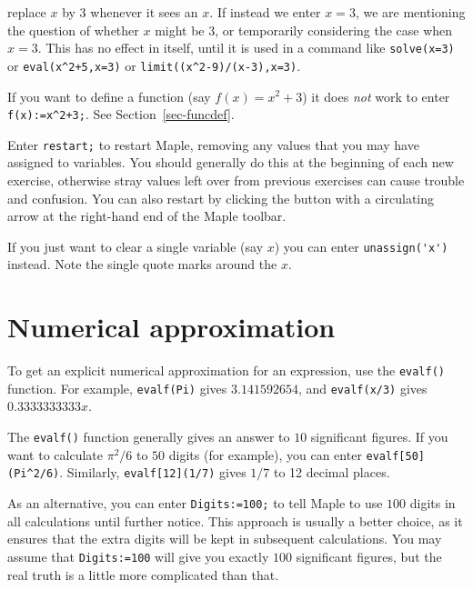 \documentclass{amsart}
\begin{document}
\begin{secenum}
 replace $x$ by $3$ whenever it sees an $x$.  If instead we
 enter $x=3$, we are mentioning the question of whether $x$
 might be $3$, or temporarily considering the case when
 $x=3$.  This has no effect in itself, until it is used in a
 command like \verb~solve(x=3)~ or \verb~eval(x^2+5,x=3)~
 or \verb~limit((x^2-9)/(x-3),x=3)~. 
%
 \item\label{funcdef}
 If you want to define a function (say $f(x)=x^2+3$) it does
 \emph{not} work to enter \verb~f(x):=x^2+3;~.  See
 Section~\ref{sec-funcdef}. 
%
 \item\label{restart}
  Enter \verb~restart;~ to restart Maple, removing any values
  that you may have assigned to variables.  You should
  generally do this at the beginning of each new exercise,
  otherwise stray values left over from previous exercises
  can cause trouble and confusion.  You can also restart by
  clicking the button with a circulating arrow at the
  right-hand end of the Maple toolbar. 
%
 \item\label{unassign}
  If you just want to clear a single variable (say $x$) you
  can enter \verb~unassign('x')~ instead.  Note the single
  quote marks around the $x$. 
\end{secenum}

\section{Numerical approximation}


\begin{secenum}
 \item\label{evalf} To get an explicit numerical approximation for an
  expression, use the \verb~evalf()~ function.  For example,
  \verb~evalf(Pi)~ gives $3.141592654$, and
  \verb~evalf(x/3)~ gives $0.3333333333 x$. 
%
 \item\label{evalfdigits} The \verb~evalf()~ function generally gives an
  answer to $10$ significant figures.  If you want to
  calculate $\pi^2/6$ to $50$ digits (for example), you can
  enter \verb~evalf[50](Pi^2/6)~.  Similarly,
  \verb~evalf[12](1/7)~ gives $1/7$ to 12 decimal places. 
%
 \item\label{digits} As an alternative, you can enter
   \verb~Digits:=100;~ to tell Maple to use $100$ digits in
   all calculations until further notice.  This approach is
   usually a better choice, as it ensures that the extra
   digits will be kept in subsequent calculations.  You may
   assume that \verb~Digits:=100~ will give you exactly
   $100$ significant figures, but the real truth is a little
   more complicated than that. 
\end{secenum}
\end{document}

